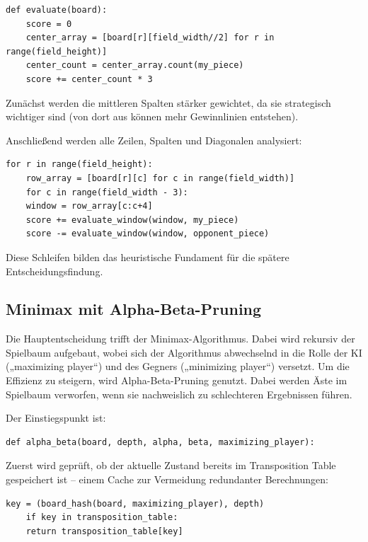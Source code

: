 \begin{lstlisting}[style=pythonstyle]
	def evaluate(board):
	score = 0
	center_array = [board[r][field_width//2] for r in range(field_height)]
	center_count = center_array.count(my_piece)
	score += center_count * 3
\end{lstlisting}

Zunächst werden die mittleren Spalten stärker gewichtet, da sie strategisch wichtiger sind (von dort aus können mehr Gewinnlinien entstehen).

Anschließend werden alle Zeilen, Spalten und Diagonalen analysiert:

\begin{lstlisting}[style=pythonstyle]
	for r in range(field_height):
	row_array = [board[r][c] for c in range(field_width)]
	for c in range(field_width - 3):
	window = row_array[c:c+4]
	score += evaluate_window(window, my_piece)
	score -= evaluate_window(window, opponent_piece)
\end{lstlisting}

Diese Schleifen bilden das heuristische Fundament für die spätere Entscheidungsfindung.

\subsection{Minimax mit Alpha-Beta-Pruning}

Die Hauptentscheidung trifft der Minimax-Algorithmus. Dabei wird rekursiv der Spielbaum aufgebaut, wobei sich der Algorithmus abwechselnd in die Rolle der KI („maximizing player“) und des Gegners („minimizing player“) versetzt. Um die Effizienz zu steigern, wird Alpha-Beta-Pruning genutzt. Dabei werden Äste im Spielbaum verworfen, wenn sie nachweislich zu schlechteren Ergebnissen führen.

Der Einstiegspunkt ist:

\begin{lstlisting}[style=pythonstyle]
	def alpha_beta(board, depth, alpha, beta, maximizing_player):
\end{lstlisting}

Zuerst wird geprüft, ob der aktuelle Zustand bereits im Transposition Table gespeichert ist – einem Cache zur Vermeidung redundanter Berechnungen:

\begin{lstlisting}[style=pythonstyle]
	key = (board_hash(board, maximizing_player), depth)
	if key in transposition_table:
	return transposition_table[key]
\end{lstlisting}

